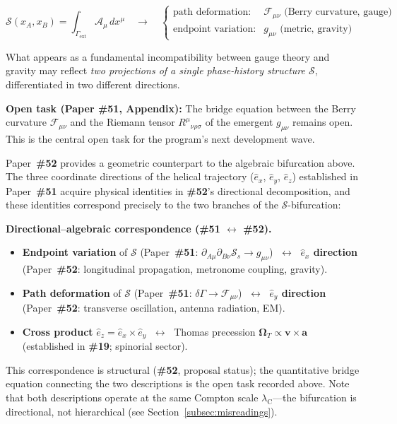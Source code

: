 \documentclass[12pt,letterpaper]{article}
\newcommand{\paperno}[1]{\textbf{\#{}#1}}
\newcommand{\OmT}{\boldsymbol{\Omega}_T}
\newcommand{\lambdaC}{\lambda_{\mathrm{C}}}
\newcommand{\calS}{\mathcal{S}}
\newcommand{\calA}{\mathcal{A}}
\newcommand{\ehat}[1]{\hat{e}_{#1}}
\begin{document}
\begin{equation}
\calS(x_A, x_B) = \int_{\Gamma_{\mathrm{ext}}} \calA_\mu\,dx^\mu
\quad\longrightarrow\quad
\begin{cases}
\text{path deformation:} & \mathcal{F}_{\mu\nu} \text{ (Berry curvature, gauge)} \\
\text{endpoint variation:} & g_{\mu\nu} \text{ (metric, gravity)}
\end{cases}
\end{equation}

What appears as a fundamental incompatibility between gauge theory and gravity may reflect
\emph{two projections of a single phase-history structure $\calS$}, differentiated
in two different directions.

\begin{mdframed}[style=openbox]
\textbf{Open task (Paper \paperno{51}, Appendix):}
The bridge equation between the Berry curvature $\mathcal{F}_{\mu\nu}$ and the
Riemann tensor $R^\mu{}_{\nu\rho\sigma}$ of the emergent $g_{\mu\nu}$ remains open.
This is the central open task for the program's next development wave.
\end{mdframed}

\noindent Paper~\paperno{52} provides a geometric counterpart to the algebraic
bifurcation above.
The three coordinate directions of the helical trajectory
($\ehat{x}$, $\ehat{y}$, $\ehat{z}$) established in Paper~\paperno{51}
acquire physical identities in \paperno{52}'s directional decomposition,
and these identities correspond precisely to the two branches
of the $\calS$-bifurcation:

\begin{mdframed}[style=orangebox]
\textbf{\textcolor{orange!80!black}{Directional--algebraic correspondence
(\paperno{51} $\leftrightarrow$ \paperno{52}).}}
\begin{itemize}[leftmargin=2em, itemsep=4pt]
  \item \textbf{Endpoint variation} of $\calS$
        (Paper~\paperno{51}: $\partial_{A\mu}\partial_{B\nu}\calS_s\to g_{\mu\nu}$)
        $\;\longleftrightarrow\;$
        \textbf{$\ehat{x}$ direction}
        (Paper~\paperno{52}: longitudinal propagation, metronome coupling, gravity).
  \item \textbf{Path deformation} of $\calS$
        (Paper~\paperno{51}: $\delta\Gamma\to\mathcal{F}_{\mu\nu}$)
        $\;\longleftrightarrow\;$
        \textbf{$\ehat{y}$ direction}
        (Paper~\paperno{52}: transverse oscillation, antenna radiation, EM).
  \item \textbf{Cross product} $\ehat{z}=\ehat{x}\times\ehat{y}$
        $\;\longleftrightarrow\;$
        Thomas precession $\OmT\propto\mathbf{v}\times\mathbf{a}$
        (established in \paperno{19}; spinorial sector).
\end{itemize}
\noindent This correspondence is structural (\paperno{52}, proposal status);
the quantitative bridge equation connecting the two descriptions
is the open task recorded above.
Note that both descriptions operate at the same Compton scale
$\lambdaC$---the bifurcation is directional, not hierarchical
(see Section~\ref{subsec:misreadings}).
\end{mdframed}
\end{document}

